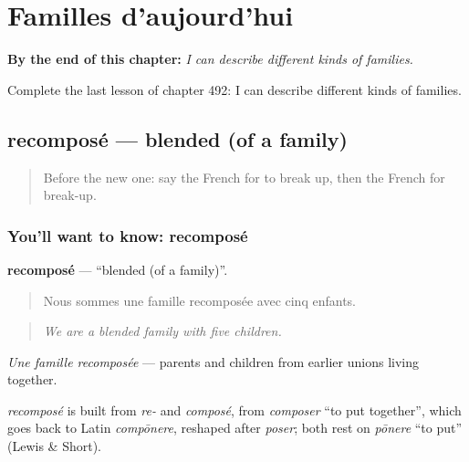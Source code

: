 
\chapter{Familles d'aujourd'hui}
\label{ch:fr-familles-d-aujourd-hui}

\begin{chapteropening}
\textbf{By the end of this chapter:} \emph{I can describe different kinds of families.}

Complete the last lesson of chapter 492: I can describe different kinds of families.
\end{chapteropening}

\section[recomposé]{recomposé — blended (of a family)}

\label{lesson:FR-C492-recompose}



\begin{quote}
Before the new one: say the French for to break up, then the French for break-up.
\end{quote}

\subsection*{You'll want to know: recomposé}
\textbf{recomposé} — \textquotedblleft{}blended (of a family)\textquotedblright{}.

\begin{quote}
Nous sommes une famille recomposée avec cinq enfants.
\end{quote}

\begin{quote}
\emph{We are a blended family with five children.}
\end{quote}

\emph{Une famille recomposée} — parents and children from earlier unions living together.

\begin{cousinweb}
\emph{recomposé} is built from \emph{re-} and \emph{composé}, from \emph{composer} \textquotedblleft{}to put together\textquotedblright{}, which goes back to Latin \emph{compōnere}, reshaped after \emph{poser}; both rest on \emph{pōnere} \textquotedblleft{}to put\textquotedblright{} (Lewis \& Short).
\end{cousinweb}

